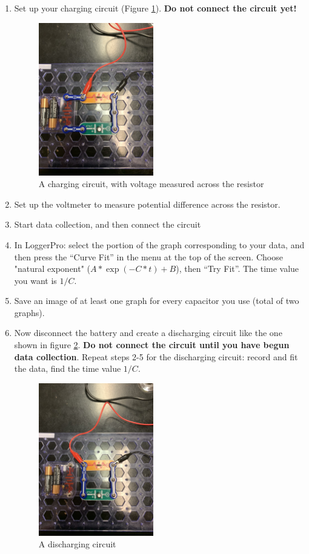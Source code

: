 \documentclass{article}
\begin{document}
\begin{enumerate}
	\item Set up your charging circuit (Figure \ref{charging}). \textbf{Do not connect the circuit yet!}
	
	\begin{figure}[ht!]
		\centering
		\includegraphics[width=5cm]{rc_charge.jpeg}
		\caption{A charging circuit, with voltage measured across the resistor}
		\label{charging}
	\end{figure}
	
	\item Set up the voltmeter to measure potential difference across the resistor.
	\item Start data collection, and then connect the circuit
	\item In LoggerPro: select the portion of the graph corresponding to your data, and then press the ``Curve Fit'' in the menu at the top of the screen. Choose "natural exponent" ($A*\exp(-C*t) + B$), then ``Try Fit''. The time value you want is $1/C$.
	\item Save an image of at least one graph for every capacitor you use (total of two graphs).
	\item Now disconnect the battery and create a discharging circuit like the one shown in figure \ref{discharging}. \textbf{Do not connect the circuit until you have begun data collection}. Repeat steps 2-5 for the discharging circuit: record and fit the data, find the time value $1/C$.
	
	\begin{figure}[ht!]
		\centering
		\includegraphics[width=5cm]{rc_discharge.jpeg}
		\caption{A discharging circuit}
		\label{discharging}
	\end{figure}
\end{enumerate}
\end{document}
